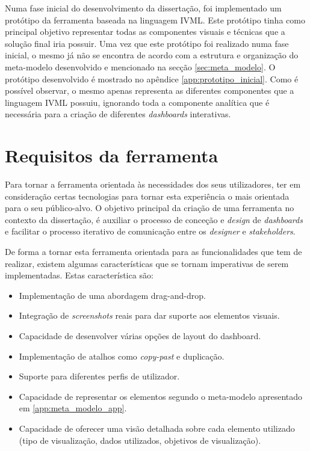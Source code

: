 Numa fase inicial do desenvolvimento da dissertação, foi implementado um protótipo da ferramenta baseada na linguagem \gls{IVML}. Este protótipo tinha como principal objetivo representar todas as componentes visuais e técnicas que a solução final iria possuir. Uma vez que este protótipo foi realizado numa fase inicial, o mesmo já não se encontra de acordo com a estrutura e organização do meta-modelo desenvolvido e mencionado na secção \ref{sec:meta_modelo}. O protótipo desenvolvido é mostrado no apêndice \ref{app:prototipo_inicial}. Como é possível observar, o mesmo apenas representa as diferentes componentes que a linguagem \gls{IVML} possuiu, ignorando toda a componente analítica que é necessária para a criação de diferentes \textit{dashboards} interativas.

\section{Requisitos da ferramenta} %
\label{sec:requisitos}

Para tornar a ferramenta orientada às necessidades dos seus utilizadores, ter em consideração certas tecnologias para tornar esta experiência o mais orientada para o seu público-alvo. O objetivo principal da criação de uma ferramenta no contexto da dissertação, é auxiliar o processo de conceção e \textit{design} de \textit{dashboards} e facilitar o processo iterativo de comunicação entre os \textit{designer} e \textit{stakeholders}.

De forma a tornar esta ferramenta orientada para as funcionalidades que tem de realizar, existem algumas características que se tornam imperativas de serem implementadas. Estas característica são:

\begin{itemize}
  \item Implementação de uma abordagem drag-and-drop.
  \item Integração de \textit{screenshots} reais para dar suporte aos elementos visuais.
  \item Capacidade de desenvolver várias opções de layout do dashboard.
  \item Implementação de atalhos como \textit{copy-past} e duplicação.
  \item Suporte para diferentes perfis de utilizador.
  \item Capacidade de representar os elementos segundo o meta-modelo apresentado em \ref{app:meta_modelo_app}.
  \item Capacidade de oferecer uma visão detalhada sobre cada elemento utilizado (tipo de visualização, dados utilizados, objetivos de visualização).
\end{itemize}